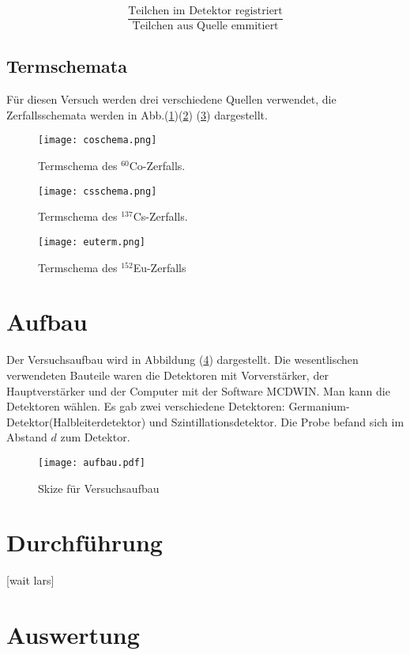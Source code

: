 \documentclass[ngerman,11pt]{article}
\begin{document}
\begin{multicols}{2}
		\[
		\frac{\text{Teilchen im Detektor registriert}}{\text{Teilchen aus Quelle emmitiert}}
		\]

		\subsection{Termschemata}
		F\"ur diesen Versuch werden drei verschiedene Quellen verwendet, die Zerfallsschemata werden in Abb.(\ref{fig:coterm})(\ref{fig:csterm}) (\ref{fig:euterm}) dargestellt.
		\begin{figure}[H]
			\centering
			\texttt{[image: coschema.png]}
			\caption{Termschema des $^{60}$Co-Zerfalls. \protect\footnotemark[1]}
			\label{fig:coterm}
		\end{figure}
		\begin{figure}[H]
			\centering
			\texttt{[image: csschema.png]}
			\caption{Termschema des $^{137}$Cs-Zerfalls. \protect\footnotemark[2]}
			\label{fig:csterm}
		\end{figure}

		\begin{figure}[H]
			\centering
			\texttt{[image: euterm.png]}
			\caption{Termschema des $^{152}$Eu-Zerfalls\cite{kern}}
			\label{fig:euterm}
		\end{figure}

		\section{Aufbau}
		Der Versuchsaufbau wird in Abbildung (\ref{fig:aufbau}) dargestellt. Die wesentlischen verwendeten Bauteile waren die Detektoren mit Vorverst\"arker, der Hauptverst\"arker und der Computer mit der Software MCDWIN. Man kann die Detektoren w\"ahlen. Es gab zwei verschiedene Detektoren: Germanium-Detektor(Halbleiterdetektor) und Szintillationsdetektor. Die Probe befand sich im Abstand $d$ zum Detektor.
		\begin{figure}[H]
			\centering
			\texttt{[image: aufbau.pdf]}
			\caption{Skize f\"ur Versuchsaufbau}
			\label{fig:aufbau}
		\end{figure}
		\section{Durchf\"uhrung}
		[wait lars]
		\section{Auswertung}

\end{multicols}
\end{document}
